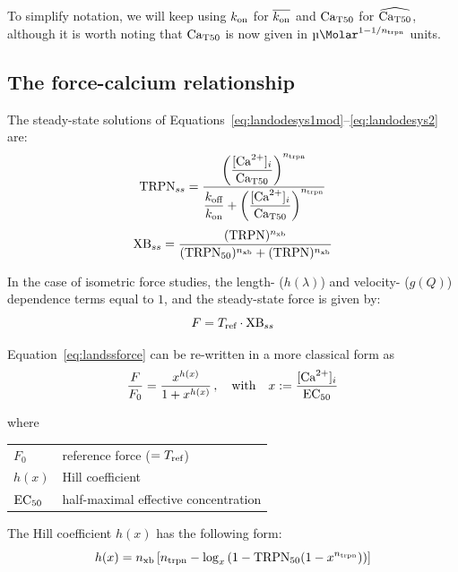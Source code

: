 \noindent
To simplify notation, we will keep using $k_{\textrm{on}}$ for $\overline{k_{\textrm{on}}}$ and $\textrm{Ca}_{\textrm{T}50}$ for $\widehat{\textrm{Ca}_{\textrm{T}50}}$, although it is worth noting that $\textrm{Ca}_{\textrm{T}50}$ is now given in $\SI{}{\micro\Molar}^{1-1/\ntrpn}$ units.


%
%
%
\subsection{The force-calcium relationship}
The steady-state solutions of Equations~\eqref{eq:landodesys1mod}--\eqref{eq:landodesys2} are:
%
\begin{equation}\label{eq:landodesys1_ss}
    \textrm{TRPN}_{ss} = \dfrac{\left(\dfrac{[\textrm{Ca}^{2+}]_{i}}{\textrm{Ca}_{\textrm{T}50}}\right)^{n_{\textrm{trpn}}}}{\dfrac{k_{\textrm{off}}}{k_{\textrm{on}}}+\left(\dfrac{[\textrm{Ca}^{2+}]_{i}}{\textrm{Ca}_{\textrm{T}50}}\right)^{n_{\textrm{trpn}}}}
\end{equation}
%
\begin{equation}\label{eq:landodesys2_ss}
    \textrm{XB}_{ss} = \frac{(\textrm{TRPN})^{n_{\textrm{xb}}}}{(\textrm{TRPN}_{50})^{n_{\textrm{xb}}}+(\textrm{TRPN})^{n_{\textrm{xb}}}}
\end{equation}

\noindent
In the case of isometric force studies, the length- ($h(\lambda)$) and velocity- ($g(Q)$) dependence terms equal to $1$, and the steady-state force is given by:
%
\begin{equation}\label{eq:landssforce}
    F = T_{\textrm{ref}}\cdot \textrm{XB}_{ss}
\end{equation}

\noindent
Equation~\eqref{eq:landssforce} can be re-written in a more classical form as
%
\begin{equation}\label{eq:forcess}
    \frac{F}{F_0} = \frac{x^{h(x)}}{1+x^{h(x)}}\,,\quad\text{with}\quad x:=\frac{[\textrm{Ca}^{2+}]_{i}}{\textrm{EC}_{50}}
\end{equation}

\noindent
where

\vspace{0.2cm}
\begin{tabular}{ll}
    $F_0$  & reference force ($=T_{\textrm{ref}}$) \\
    $h(x)$ & Hill coefficient \\
    $\textrm{EC}_{50}$ & half-maximal effective concentration
\end{tabular}

\vspace{0.3cm}\noindent
The Hill coefficient $h(x)$ has the following form:
%
\begin{equation}
    h(x) = n_{\textrm{xb}}\left[n_{\textrm{trpn}}-\log_{x}{\left(1-\textrm{TRPN}_{50}(1-x^{n_{\textrm{trpn}}})\right)}\right]
\end{equation}

